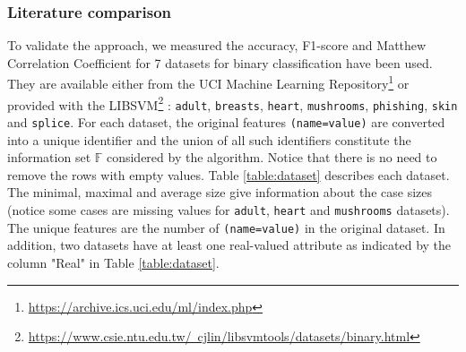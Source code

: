 \documentclass[preprint,12pt]{elsarticle}
\theoremstyle{definition}
\begin{document}
\subsubsection{Literature comparison}
To validate the approach, we measured the accuracy, F1-score and Matthew Correlation Coefficient for 7 datasets for binary classification have been used. They are available either from the UCI Machine Learning Repository\footnote{\href{https://archive.ics.uci.edu/ml/index.php}{https://archive.ics.uci.edu/ml/index.php}}
 or provided with the LIBSVM\footnote{\href{https://www.csie.ntu.edu.tw/~cjlin/libsvmtools/datasets/binary.html}{https://www.csie.ntu.edu.tw/~cjlin/libsvmtools/datasets/binary.html}}
 : \texttt{adult},
  \texttt{breasts}, \texttt{heart}, \texttt{mushrooms}, \texttt{phishing}, \texttt{skin} and \texttt{splice}. For each dataset, the original features \texttt{(name=value)} are converted into a unique identifier and the union of all such identifiers constitute the information set $\mathbb{F}$ considered by the algorithm. Notice that there is no need to remove the rows with empty values.
  Table \ref{table:dataset} describes each dataset. The minimal, maximal and average size give information about the case sizes (notice some cases are missing values for \texttt{adult}, \texttt{heart} and \texttt{mushrooms} datasets). The unique features are the number of \texttt{(name=value)} in the original dataset. In addition, two datasets have at least one real-valued attribute as indicated by the column "Real" in Table \ref{table:dataset}. 
\end{document}
